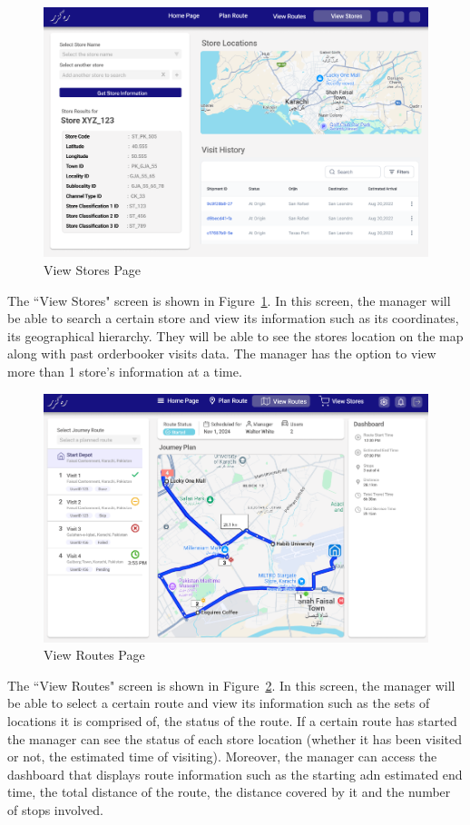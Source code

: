\begin{figure}[H]
    \centering
    \includegraphics[width=1\textwidth]{images/View Stores.png} %
    \caption{View Stores Page}
    \label{fig:image5}
\end{figure}
The ``View Stores" screen is shown in Figure~\ref{fig:image5}. In this screen, the manager will be able to search a certain store and view its information such as its coordinates, its geographical hierarchy. They will be able to see the stores location on the map along with past orderbooker visits data. The manager has the option to view more than 1 store's information at a time.

\begin{figure}[H]
    \centering
    \includegraphics[width=1\textwidth]{images/View Routes.png} %
    \caption{View Routes Page}
    \label{fig:image6}
\end{figure}
The ``View Routes" screen is shown in Figure~\ref{fig:image6}. In this screen, the manager will be able to select a certain route and view its information such as the sets of locations it is comprised of, the status of the route. If a certain route has started the manager can see the status of each store location (whether it has been visited or not, the estimated time of visiting). Moreover, the manager can access the dashboard that displays route information such as the starting adn estimated end time, the total distance of the route, the distance covered by it and the number of stops involved.

